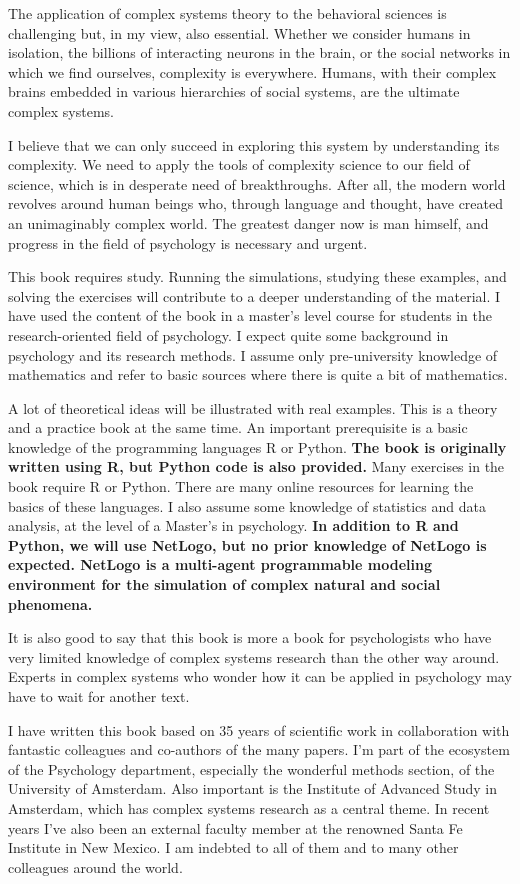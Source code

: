 \documentclass[
  a4paper,
  DIV=11,
  numbers=noendperiod]{scrreprt}
\begin{document}
The application of complex systems theory to the behavioral sciences is
challenging but, in my view, also essential. Whether we consider humans
in isolation, the billions of interacting neurons in the brain, or the
social networks in which we find ourselves, complexity is everywhere.
Humans, with their complex brains embedded in various hierarchies of
social systems, are the ultimate complex systems.

I believe that we can only succeed in exploring this system by
understanding its complexity. We need to apply the tools of complexity
science to our field of science, which is in desperate need of
breakthroughs. After all, the modern world revolves around human beings
who, through language and thought, have created an unimaginably complex
world. The greatest danger now is man himself, and progress in the field
of psychology is necessary and urgent.

This book requires study. Running the simulations, studying these
examples, and solving the exercises will contribute to a deeper
understanding of the material. I have used the content of the book in a
master's level course for students in the research-oriented field of
psychology. I expect quite some background in psychology and its
research methods. I assume only pre-university knowledge of mathematics
and refer to basic sources where there is quite a bit of mathematics.

A lot of theoretical ideas will be illustrated with real examples. This
is a theory and a practice book at the same time. An important
prerequisite is a basic knowledge of the programming languages R or
Python. \textbf{The book is originally written using R, but Python code
is also provided.} Many exercises in the book require R or Python. There
are many online resources for learning the basics of these languages. I
also assume some knowledge of statistics and data analysis, at the level
of a Master's in psychology. \textbf{In addition to R and Python, we
will use NetLogo, but no prior knowledge of NetLogo is expected. NetLogo
is a multi-agent programmable modeling environment for the simulation of
complex natural and social phenomena.}

It is also good to say that this book is more a book for psychologists
who have very limited knowledge of complex systems research than the
other way around. Experts in complex systems who wonder how it can be
applied in psychology may have to wait for another text.

I have written this book based on 35 years of scientific work in
collaboration with fantastic colleagues and co-authors of the many
papers. I'm part of the ecosystem of the Psychology department,
especially the wonderful methods section, of the University of
Amsterdam. Also important is the Institute of Advanced Study in
Amsterdam, which has complex systems research as a central theme. In
recent years I've also been an external faculty member at the renowned
Santa Fe Institute in New Mexico. I am indebted to all of them and to
many other colleagues around the world.
\end{document}
